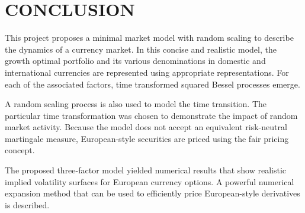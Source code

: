 \documentclass[a4 paper, 12pt]{report}
\theoremstyle{plain}
\begin{document}
\chapter{CONCLUSION}
\noindent
\par %
\par This project proposes a minimal market model with random scaling to describe the dynamics of a currency market. In this concise and realistic model, the growth optimal portfolio and its various denominations in domestic and international currencies are represented using appropriate representations. For each of the associated factors, time transformed squared Bessel processes emerge.\\
\par A random scaling process is also used to model the time transition. The particular time transformation was chosen to demonstrate the impact of random market activity. Because the model does not accept an equivalent risk-neutral martingale measure, European-style securities are priced using the fair pricing concept.


\par The proposed three-factor model yielded numerical results that show realistic implied volatility surfaces for European currency options. A powerful numerical expansion method that can be used to efficiently price European-style derivatives is described.
\end{document}
